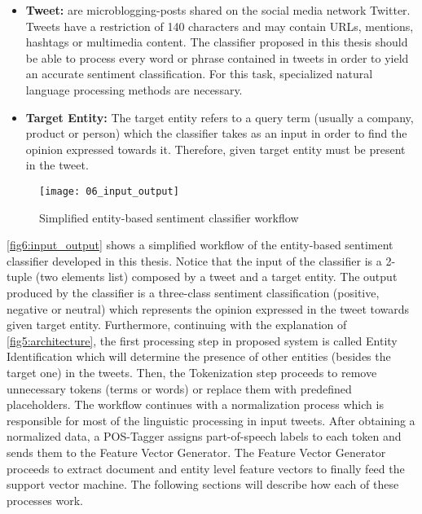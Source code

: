 \begin{itemize}
\itemsep0em 

\item \textbf{Tweet:} are microblogging-posts shared on the social media network Twitter. Tweets have a restriction of 140 characters and may contain URLs, mentions, hashtags or multimedia content. The classifier proposed in this thesis should be able to process every word or phrase contained in tweets in order to yield an accurate sentiment classification. For this task, specialized natural language processing methods are necessary.

\item \textbf{Target Entity:} The target entity refers to a query term (usually a company, product or person) which the classifier takes as an input in order to find the opinion expressed towards it. Therefore, given target entity must be present in the tweet. 

\end{itemize}

\begin{figure}[H]
    \centering
    \caption{Simplified entity-based sentiment classifier workflow}
    \texttt{[image: 06\_input\_output]}
    \label{fig6:input_output}
\end{figure}

\autoref{fig6:input_output} shows a simplified workflow of the entity-based sentiment classifier developed in this thesis. Notice that the input of the classifier is a 2-tuple (two elements list) composed by a tweet and a target entity. The output produced by the classifier is a three-class sentiment classification (positive, negative or neutral) which represents the opinion expressed in the tweet towards given target entity. Furthermore, continuing with the explanation of \autoref{fig5:architecture}, the first processing step in proposed system is called Entity Identification which will determine the presence of other entities (besides the target one) in the tweets. Then, the Tokenization step proceeds to remove unnecessary tokens (terms or words) or replace them with predefined placeholders. The workflow continues with a normalization process which is responsible for most of the linguistic processing in input tweets. After obtaining a normalized data, a POS-Tagger assigns part-of-speech labels to each token and sends them to the Feature Vector Generator. The Feature Vector Generator proceeds to extract document and entity level feature vectors to finally feed the support vector machine. The following sections will describe how each of these processes work.   

